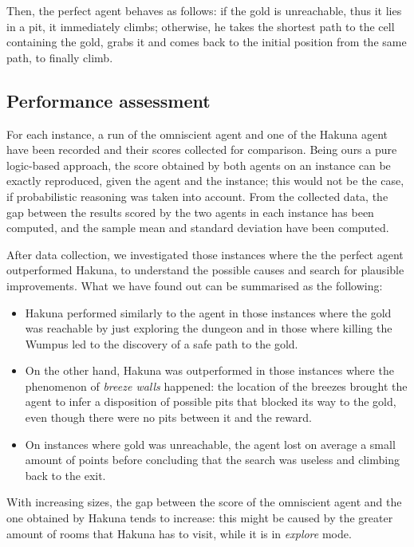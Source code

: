 \documentclass{llncs}
\begin{document}
Then, the perfect agent behaves as follows: if the gold is unreachable, thus it lies in a pit, it immediately climbs; otherwise, he takes the shortest path to the cell containing the gold, grabs it and comes back to the initial position from the same path, to finally climb.

\subsection{Performance assessment}

For each instance, a run of the omniscient agent and one of the Hakuna agent have been recorded and their scores collected for comparison.
Being ours a pure logic-based approach, the score obtained by both agents on an instance can be exactly reproduced, given the agent and the instance; this would not be the case, if probabilistic reasoning was taken into account.
From the collected data, the gap between the results scored by the two agents in each instance has been computed, and the sample mean and standard deviation have been computed.

After data collection, we investigated those instances where the the perfect agent outperformed Hakuna, to understand the possible causes and search for plausible improvements.
What we have found out can be summarised as the following:
\begin{itemize}
	\item Hakuna performed similarly to the agent in those instances where the gold was reachable by just exploring the dungeon and in those where killing the Wumpus led to the discovery of a safe path to the gold.
	\item On the other hand, Hakuna was outperformed in those instances where the phenomenon of \emph{breeze walls} happened: the location of the breezes brought the agent to infer a disposition of possible pits that blocked its way to the gold, even though there were no pits between it and the reward.
	\item On instances where gold was unreachable, the agent lost on average a small amount of points before concluding that the search was useless and climbing back to the exit.
\end{itemize}

With increasing sizes, the gap between the score of the omniscient agent and the one obtained by Hakuna tends to increase: this might be caused by the greater amount of rooms that Hakuna has to visit, while it is in \emph{explore} mode. 
\end{document}
